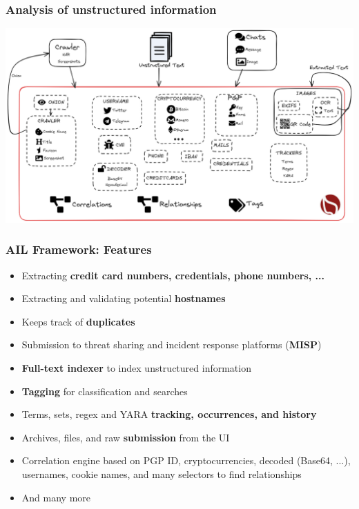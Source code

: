 \documentclass[aspectratio=169]{beamer}
\begin{document}
\begin{frame}
    \frametitle{Analysis of unstructured information}
    \begin{center}
        \includegraphics[scale=0.225]{images/ail-internal.png}
    \end{center}
\end{frame}

\begin{frame}
    \frametitle{AIL Framework: Features}
    \begin{itemize}
        \item Extracting \textbf{credit card numbers, credentials, phone numbers, ...}
        \item Extracting and validating potential \textbf{hostnames}
        \item Keeps track of \textbf{duplicates}
        \item Submission to threat sharing and incident response platforms (\textbf{MISP}) %
        \item \textbf{Full-text indexer} to index unstructured information
        \item \textbf{Tagging} for classification and searches
        \item Terms, sets, regex and YARA \textbf{tracking, occurrences, and history}
        \item Archives, files, and raw \textbf{submission} from the UI
        \item Correlation engine based on PGP ID, cryptocurrencies, decoded (Base64, ...), usernames, cookie names, and many selectors to find relationships
        \item And many more
    \end{itemize}
\end{frame}
\end{document}
